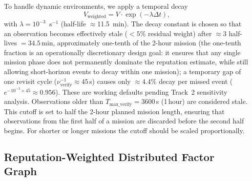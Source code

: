 \documentclass[conference,10pt]{IEEEtran}
\begin{document}
To handle dynamic environments, we apply a temporal decay
\begin{equation}
V_\text{weighted} = V \cdot \exp(-\lambda \Delta t),
\end{equation}
with $\lambda = 10^{-3}$~s$^{-1}$ (half-life $\approx$11.5~min). The decay constant is chosen so that an observation becomes effectively stale ($<5\%$ residual weight) after $\approx 3$ half-lives $=34.5$\,min, approximately one-tenth of the 2-hour mission (the one-tenth fraction is an operationally discretionary design goal: it ensures that any single mission phase does not permanently dominate the reputation estimate, while still allowing short-horizon events to decay within one mission); a temporary gap of one revisit cycle ($\nu_\text{verify}^{-1}\approx 45$\,s) causes only $\approx 4.4\%$ decay per missed event ($e^{-10^{-3}\times 45}\approx 0.956$). These are working defaults pending Track~2 sensitivity analysis. Observations older than $T_\text{max\_verify} = 3600$\,s (1\,hour) are considered stale. This cutoff is set to half the 2-hour planned mission length, ensuring that observations from the first half of a mission are discarded before the second half begins. For shorter or longer missions the cutoff should be scaled proportionally.

\subsection{Reputation-Weighted Distributed Factor Graph}
\end{document}
